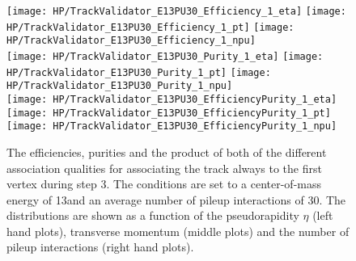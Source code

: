 \begin{figure}[Ht]
    \centering
    \texttt{[image: HP/TrackValidator\_E13PU30\_Efficiency\_1\_eta]}
    \texttt{[image: HP/TrackValidator\_E13PU30\_Efficiency\_1\_pt]}
    \texttt{[image: HP/TrackValidator\_E13PU30\_Efficiency\_1\_npu]}
    \\
    \texttt{[image: HP/TrackValidator\_E13PU30\_Purity\_1\_eta]}
    \texttt{[image: HP/TrackValidator\_E13PU30\_Purity\_1\_pt]}
    \texttt{[image: HP/TrackValidator\_E13PU30\_Purity\_1\_npu]}
    \\
    \texttt{[image: HP/TrackValidator\_E13PU30\_EfficiencyPurity\_1\_eta]}
    \texttt{[image: HP/TrackValidator\_E13PU30\_EfficiencyPurity\_1\_pt]}
    \texttt{[image: HP/TrackValidator\_E13PU30\_EfficiencyPurity\_1\_npu]}
    \caption[Efficiencies, purities and their product of the different qualities of the association map with associating the track always to the first vertex during step 3 with 13\TeV and $\left<PU\right>=30$]{The efficiencies, purities and the product of both of the different association qualities for associating the track always to the first vertex during step 3. The conditions are set to a center-of-mass energy of 13\TeV and an average number of pileup interactions of 30. The distributions are shown as a function of the pseudorapidity $\eta$ (left hand plots), transverse momentum (middle plots) and the number of pileup interactions (right hand plots). \label{plot:HPUTAE13PU30ZtomumuQual1}}
\end{figure}

